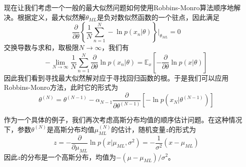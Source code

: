 现在让我们考虑一个一般的最大似然问题如何使用Robbins-Monro算法顺序地解决。根据定义，最大似然解$\theta_{ML}$是负对数似然函数的一个驻点，因此满足
\begin{equation}
	\frac{\partial }{\partial \theta}\left\{\frac{1}{N}\sum_{n=1}^{N}-\ln p(x_n|\theta) \right\}\Bigg|_{\theta_{ML}}=0
\end{equation}
交换导数与求和，取极限$N\to \infty$，我们有
\begin{equation}
	-\lim_{N\to \infty}\frac{1}{N}\sum_{n=1}^{N}\frac{\partial }{\partial \theta}\ln p(x_n|\theta)=\mathbb{E}_x\left[-\frac{\partial }{\partial \theta}\ln p(x|\theta) \right]
\end{equation}
因此我们看到寻找最大似然解对应于寻找回归函数的根。于是我们可以应用Robbins-Monro方法，此时它的形式为
\begin{equation}
	\theta^{(N)}=\theta^{(N-1)}-\alpha_{N-1}\frac{\partial }{\partial \theta^{(N-1)}}\left[-\ln p(x_N|\theta^{(N-1)}) \right]
\end{equation}

作为一个具体的例子，我们再次考虑高斯分布均值的顺序估计问题。在这种情况下，参数$\theta^{(N)}$是高斯分布均值$\mu_{ML}^{(N)}$的估计，随机变量$z$的形式为
\begin{equation}
	z=-\frac{\partial }{\partial \mu_{ML}}\ln p(x|\mu_{ML},\sigma^2)=-\frac{1}{\sigma^2}(x-\mu_{ML})
\end{equation}
因此$z$的分布是一个高斯分布，均值为$-(\mu-\mu_{ML})/\sigma^2$。
